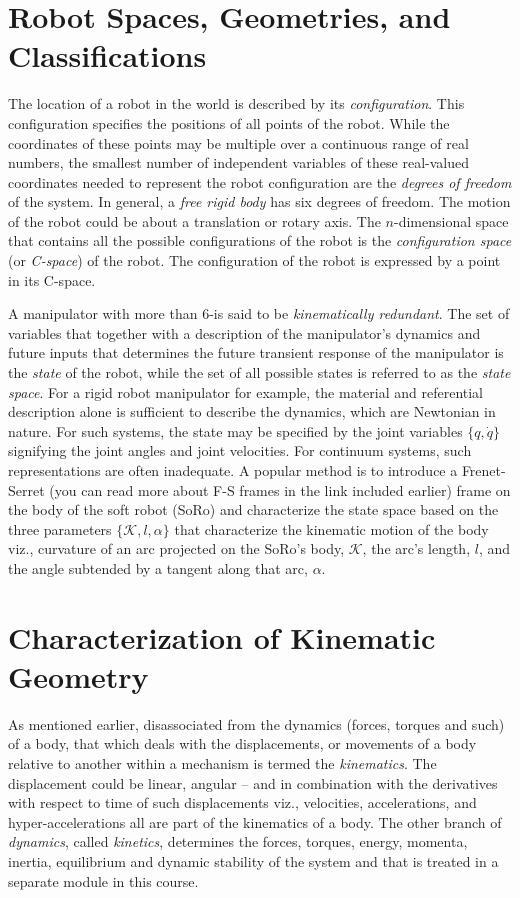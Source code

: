  \section{Robot Spaces, Geometries, and Classifications}
 
 The location of a robot in the world is described by its \textit{configuration}. This configuration specifies the positions of all points of the robot. While the coordinates of these points may be multiple over a continuous range of real numbers, the smallest number of independent variables of these real-valued coordinates needed to represent the robot configuration are the \textit{degrees of freedom} of the system.  In general, a \textit{free rigid body} has six degrees of freedom. The motion of the robot could be about a translation or rotary axis. The $n$-dimensional space that contains all the possible configurations of the robot is the \textit{configuration space} (or \textit{C-space}) of the robot. The configuration of the robot is expressed by a point in its C-space. 
 
 A manipulator with more than 6-\dof is said to be \textit{kinematically redundant}. %
 The set of variables that together with a description of the manipulator's dynamics and future inputs that determines the future transient response of the manipulator is the \textit{state} of the robot, while the set of all possible states is referred to as the \textit{state space}. For a rigid robot manipulator for example, the material and referential description alone is sufficient to describe the dynamics, which are Newtonian in nature. For such systems, the state may be specified by the joint variables $\{q, \dot{q}\}$ signifying the joint angles and joint velocities. For continuum systems, such representations are often inadequate. A popular method is to introduce a Frenet-Serret (you can read more about F-S frames in the link included earlier) frame on the body of the soft robot (SoRo) and characterize the state space based on the three parameters \ie $\{\mathcal{K}, l, \alpha\}$ that characterize the kinematic motion of the body viz., curvature of an arc projected on the SoRo's body, $\mathcal{K}$, the arc's length, $l$, and the angle subtended by a tangent along that arc, $\alpha$.
 
 \section{Characterization of Kinematic Geometry}
 As mentioned earlier, disassociated from the dynamics (\ie forces, torques and such) of a body, that which deals with the displacements, or movements of a body relative to another within a mechanism is termed the \textit{kinematics}. The displacement could be linear, angular -- and in combination with the derivatives with respect to time of such displacements viz., velocities, accelerations, and hyper-accelerations all are part of the kinematics of a body. The other branch of \textit{dynamics}, called \textit{kinetics}, determines the forces, torques, energy, momenta, inertia, equilibrium and dynamic stability of the system and that is treated in a separate module in this course.
 
